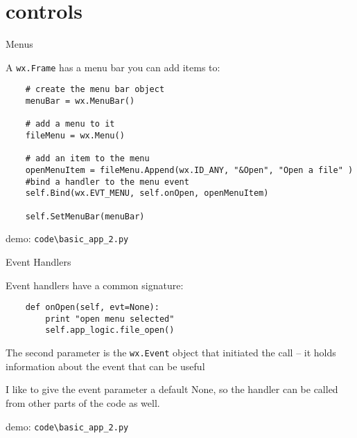 \documentclass{beamer}
\begin{document}
\section{controls}

\begin{frame}[fragile]{Menus}

\vfill
{\Large A \verb`wx.Frame` has a menu bar you can add items to:}

\begin{verbatim}
    # create the menu bar object
    menuBar = wx.MenuBar()
        
    # add a menu to it
    fileMenu = wx.Menu()

    # add an item to the menu
    openMenuItem = fileMenu.Append(wx.ID_ANY, "&Open", "Open a file" )
    #bind a handler to the menu event
    self.Bind(wx.EVT_MENU, self.onOpen, openMenuItem)

    self.SetMenuBar(menuBar)
\end{verbatim}
        
\vfill
demo: \verb`code\basic_app_2.py`

\end{frame}

\begin{frame}[fragile]{Event Handlers}

\vfill
{\Large Event handlers have a common signature:}

\vfill
\begin{verbatim}
    def onOpen(self, evt=None):
        print "open menu selected"
        self.app_logic.file_open()
\end{verbatim}

\vfill
{\large The second parameter is the \verb`wx.Event` object that initiated the call -- it holds information about the event that can be useful}

\vfill
{\large I like to give the event parameter a default None, so the handler can be called from other parts of the code as well.}
        
\vfill
demo: \verb`code\basic_app_2.py`

\end{frame}
\end{document}
